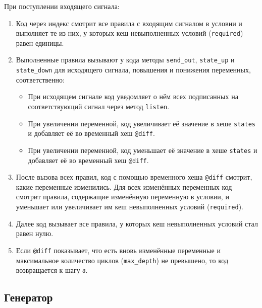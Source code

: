 \documentclass[utf8,a5paper,portrait,10pt]{eskdtext}
\begin{document}
При поступлении входящего сигнала:
\begin{enumerate}
  \item Код через индекс смотрит все правила с входящим сигналом в условии и
        выполняет те из них, у которых кеш невыполненных условий
        (\texttt{required}) равен единицы.
  \item Выполненные правила вызывают у кода методы \texttt{send\_out},
        \texttt{state\_up} и \texttt{state\_down} для исходящего сигнала,
        повышения и понижения переменных, соответственно:
        \begin{itemize}
          \item При исходящем сигнале код уведомляет о нём всех подписанных
                на соответствующий сигнал через метод \texttt{listen}.
          \item При увеличении переменной, код увеличивает её значение в хеше
                \texttt{states} и добавляет её во временный хеш \texttt{@diff}.
          \item При увеличении переменной, код уменьшает её значение в хеше
                \texttt{states} и добавляет её во временный хеш \texttt{@diff}.
        \end{itemize}
  \item После вызова всех правил, код с помощью временного хеша \texttt{@diff}
        смотрит, какие переменные изменились. Для всех изменённых переменных
        код смотрит правила, содержащие изменённую переменную в условии, и
        уменьшает или увеличивает им кеш невыполненных условий
        (\texttt{required}).
  \item Далее код вызывает все правила, у которых кеш невыполненных условий
        стал равен нулю.
  \item Если \texttt{@diff} показывает, что есть вновь изменённые переменные и
        максимальное количество циклов (\texttt{max\_depth}) не превышено, то
        код возвращается к шагу \textit{в}.
\end{enumerate}

\subsection{Генератор}
\end{document}
